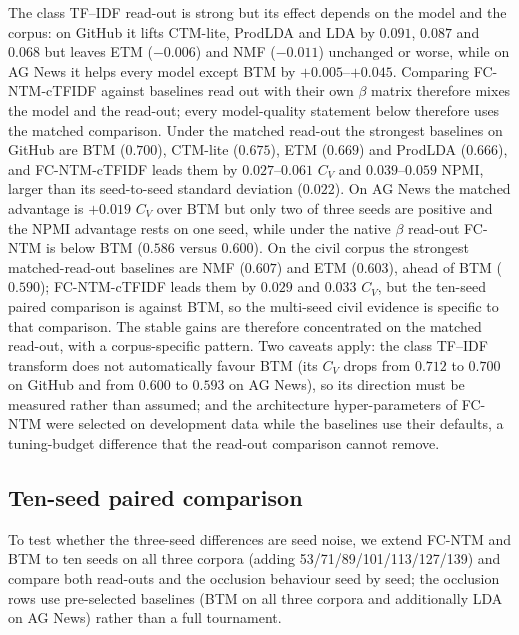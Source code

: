 \documentclass[Journal,letterpaper]{ascelike-new}
\newcommand{\fcntm}{FC-NTM}
\begin{document}
The class TF--IDF read-out is strong but its effect depends on the model and the corpus: on GitHub
it lifts CTM-lite, ProdLDA and LDA by $0.091$, $0.087$ and $0.068$ but leaves ETM ($-0.006$) and
NMF ($-0.011$) unchanged or worse, while on AG News it helps every model except BTM by
$+0.005$--$+0.045$. Comparing \fcntm{}-cTFIDF against baselines read out with their own $\beta$
matrix therefore mixes the model and the read-out; every model-quality statement below therefore uses the matched comparison. Under the matched read-out the strongest baselines on GitHub are BTM ($0.700$),
CTM-lite ($0.675$), ETM ($0.669$) and ProdLDA ($0.666$), and \fcntm{}-cTFIDF leads them by
$0.027$--$0.061$ $C_V$ and $0.039$--$0.059$ NPMI, larger than its seed-to-seed standard deviation
($0.022$). On AG News the matched advantage is $+0.019$ $C_V$ over BTM but only two of three seeds
are positive and the NPMI advantage rests on one seed, while under the native $\beta$ read-out
\fcntm{} is below BTM ($0.586$ versus $0.600$). On the civil corpus the strongest
matched-read-out baselines are NMF ($0.607$) and ETM ($0.603$), ahead of BTM ($0.590$);
\fcntm{}-cTFIDF leads them by $0.029$ and $0.033$ $C_V$, but the ten-seed paired comparison is
against BTM, so the multi-seed civil evidence is specific to that comparison. The stable gains are therefore concentrated on the matched read-out, with a corpus-specific pattern. Two caveats apply: the class TF--IDF transform does not
automatically favour BTM (its $C_V$ drops from $0.712$ to $0.700$ on GitHub and from $0.600$ to
$0.593$ on AG News), so its direction must be measured rather than assumed; and the architecture
hyper-parameters of \fcntm{} were selected on development data while the baselines use their
defaults, a tuning-budget difference that the read-out comparison cannot remove.

\subsection{Ten-seed paired comparison}

To test whether the three-seed differences are seed noise, we extend \fcntm{} and BTM to ten seeds
on all three corpora (adding 53/71/89/101/113/127/139) and compare both read-outs and the
occlusion behaviour seed by seed; the occlusion rows use pre-selected baselines (BTM on all three
corpora and additionally LDA on AG News) rather than a full tournament.
\end{document}
